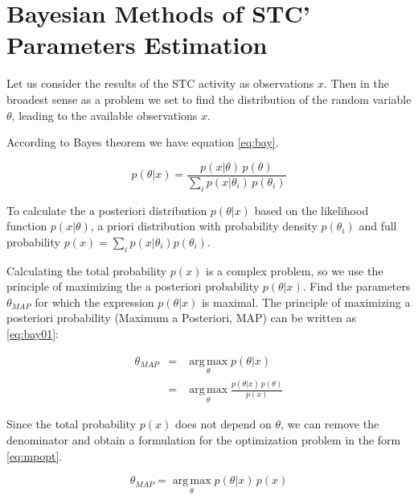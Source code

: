 \documentclass[12pt]{report}
\theoremstyle{definition}
\begin{document}
\section{Bayesian Methods of STC' Parameters Estimation}

Let us consider the results of the STC activity as observations $x$.
Then in the broadest sense as a problem we set to find the distribution of the random variable $\theta$, leading to the available observations $x$.

According to Bayes theorem we have equation \ref{eq:bay}.

\begin{equation} \label{eq:bay}
p \left( \theta \vert x \right) = \frac{p \left(  x \vert \theta \right) \, p \left( \theta \right)} {\sum_i p \left( x \vert \theta_i \right) \, p \left( \theta_i \right)}
\end{equation}

To calculate the a posteriori distribution $p \left( \theta \vert x \right)$ based on the likelihood function $p \left(  x \vert \theta \right)$, a priori distribution with probability density $p \left( \theta_i \right)$ and full probability $p \left( x \right) = \sum_i p \left( x \vert \theta_i \right) p \left( \theta_i \right)$.
	
Calculating the total probability $p \left( x \right)$ is a complex problem, so we use the principle of maximizing the a posteriori probability $p \left( \theta \vert x \right) $.
Find the parameters $\theta_{MAP}$ for which the expression $p \left( \theta \vert x \right) $ is maximal.
The principle of maximizing a posteriori probability (Maximum a Posteriori, MAP) can be written as \ref{eq:bay01}:

\begin{eqnarray} \label{eq:bay01}	 
	\theta_{MAP} & = & \operatorname*{arg\,max}_\theta p \left( \theta \vert x \right)\\
	& = & \operatorname*{arg\,max}_\theta \frac{p \left( \theta \vert x \right) \, p\left( \theta \right)} {p \left( x \right)}
\end{eqnarray}

Since the total probability $p \left(  x \right) $ does not depend on $\theta$, we can remove the denominator and obtain a formulation for the optimization problem in the form \ref{eq:mpopt}.

\begin{equation} \label{eq:mpopt}
\theta_{MAP} = \operatorname*{arg\,max}_\theta p \left( \theta \vert x \right) \, p \left( x \right)
\end{equation}
\end{document}
